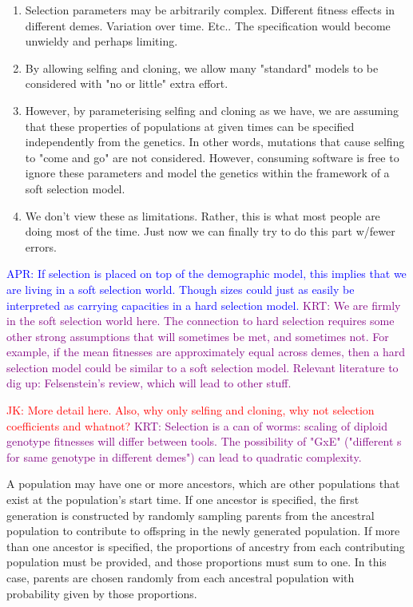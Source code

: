 \documentclass[11pt]{article}
\newcommand{\aprcomment}[1]{{\textcolor{blue}{APR: #1}}}
\newcommand{\jkcomment}[1]{{\textcolor{red}{JK: #1}}}
\newcommand{\krtcomment}[1]{{\textcolor{purple}{KRT: #1}}}
\begin{document}
\begin{enumerate}
    \item Selection parameters may be arbitrarily complex.  Different fitness effects in different demes.
          Variation over time.  Etc..
          The specification would become unwieldy and perhaps limiting.
    \item By allowing selfing and cloning, we allow many "standard" models to be considered with "no or little"
          extra effort.
    \item However, by parameterising selfing and cloning as we have, we are assuming that these properties of
          populations at given times can be specified independently from the genetics.
          In other words, mutations that cause selfing to "come and go" are not considered.
          However, consuming software is free to ignore these parameters and model the genetics within
          the framework of a soft selection model.
    \item We don't view these as limitations. Rather, this is what most people are doing most of the time.
          Just now we can finally try to do this part w/fewer errors.
\end{enumerate}


\aprcomment{If selection is placed on top of the demographic model, this implies
that we are living in a soft selection world. Though sizes could just as easily
be interpreted as carrying capacities in a hard selection model.}
\krtcomment{We are firmly in the soft selection world here.  The connection to hard selection
requires some other strong assumptions that will sometimes be met, and sometimes not.
For example, if the mean fitnesses are approximately equal across demes, then a hard selection
model could be similar to a soft selection model.  Relevant literature to dig up: Felsenstein's review,
which will lead to other stuff.}

\jkcomment{More detail here. Also, why only selfing and cloning, why not selection
coefficients and whatnot?}
\krtcomment{Selection is a can of worms: scaling of diploid genotype fitnesses will differ between tools.
The possibility of "GxE" ("different s for same genotype in different demes") can lead to quadratic complexity.}

A population may have one
or more ancestors, which are other populations that exist at the population's
start time. If one ancestor is specified, the first generation is constructed
by randomly sampling parents from the ancestral population to contribute to
offspring in the newly generated population. If more than one ancestor is
specified, the proportions of ancestry from each contributing population must
be provided, and those proportions must sum to one. In this case, parents are
chosen randomly from each ancestral population with probability given by those
proportions.
\end{document}
